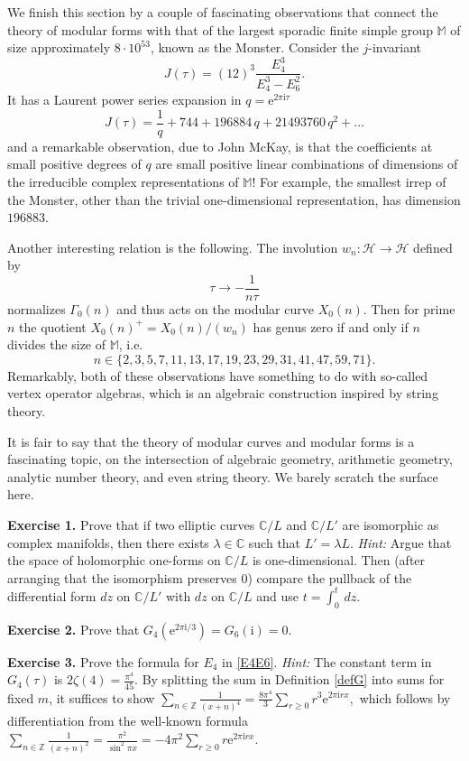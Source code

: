 \documentclass[11pt]{article}
\numberwithin{equation}{section}
\numberwithin{footnote}{section}
\newcommand{\blue}{\color{blue}}
\newcommand{\ee}{{\mathrm e}}
\newcommand{\ii}{{\mathrm i}}
\newcommand{\Z}{{\mathbb Z}}
\newcommand{\C}{{\mathbb C}}
\begin{document}
\smallskip
We finish this section by a couple of fascinating observations that connect the theory of modular forms with that of the largest sporadic finite simple group $\mathbb M$ of size approximately $8\cdot 10^{53}$, known as the Monster. 
Consider the {\blue $j$-invariant} 
$$
J(\tau) = (12)^3 \frac {E_4^3}{E_4^3-E_6^2}.
$$
It has a Laurent power series expansion in $q=\ee^{2\pi\ii\tau}$ 
$$
J(\tau) = \frac 1q + 744 + 196884\,q + 21493760\,q^2 + \ldots
$$
and a remarkable observation, due to John McKay, is that the coefficients at small positive degrees of $q$ are {\blue small positive linear combinations} of dimensions of the irreducible complex representations of $\mathbb M$! For example, the smallest irrep of the Monster, other than
the trivial one-dimensional representation, has dimension $196883$.

\smallskip
Another interesting relation is the following. The involution $w_n:\mathcal H\to \mathcal H$ defined by 
$$\tau\to -\frac 1{n\tau}$$ 
normalizes $\Gamma_0(n)$ and thus acts on the modular curve $X_0(n)$. Then for prime $n$ the quotient $X_0(n)^+ = X_0(n)/(w_n)$ has genus zero if and only if $n$ divides the size of $\mathbb M$,
i.e.
$$
n\in\{
2,3,5,7,11,13,17 ,19 , 23 ,29 , 31, 41,47 ,59 ,71\}.
$$
Remarkably, both of these observations have something to do with so-called vertex operator algebras, which is an algebraic construction inspired by string theory.

\smallskip
It is fair to say that the theory of modular curves and modular forms is a fascinating topic, on the intersection of algebraic geometry, arithmetic geometry, analytic number theory, and even string theory. We barely scratch the surface here.


{\bf Exercise 1.} Prove that if two elliptic curves $\C/L$ and $\C/L'$ are isomorphic as complex manifolds, then there exists $\lambda \in \C$ such that $L'= \lambda L$. \emph{Hint:} Argue that the space of holomorphic one-forms on $\C/L$ is one-dimensional. Then (after arranging that the isomorphism preserves $0$) compare the pullback of the differential form $dz$
on $\C/L'$ with $dz$ on $\C/L$ and use $t=\int_{0}^t \,dz$.

{\bf Exercise 2.} Prove that $G_4(\ee^{2\pi\ii/3})=G_6(\ii)=0$.

{\bf Exercise 3.} Prove the formula for $E_4$ in \eqref{E4E6}.
\emph{Hint:} The constant term in $G_4(\tau)$ is $2\zeta(4) = \frac {\pi^4}{45}$.
By splitting the sum in Definition \ref{defG} into sums for fixed $m$, it suffices to show
$
\sum_{n\in \Z} \frac 1{(x + n)^4} = \frac {8\pi^4}3\sum_{r\geq 0} r^3 \ee^{2\pi\ii r x},
$
which follows by differentiation from the well-known formula
$
\sum_{n\in \Z} \frac 1{(x + n)^2}  =\frac {\pi^2}{\sin^2 \pi x}= - 4\pi^2 \sum_{r\geq 0} r \ee^{2\pi\ii r x}.
$
\end{document}
